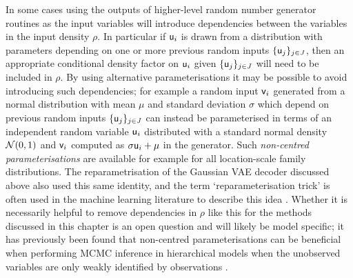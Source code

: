 In some cases using the outputs of higher-level random number generator routines as the input variables will introduce dependencies between the variables in the input density $\rho$. In particular if $\mathsf{u}_i$ is drawn from a distribution with parameters depending on one or more previous random inputs $\lbrace \mathsf{u}_j\rbrace_{j\in\mathit{J}}$, then an appropriate conditional density factor on $\mathsf{u}_i$ given $\lbrace \mathsf{u}_j\rbrace_{j\in\mathit{J}}$ will need to be included in $\rho$. By using alternative parameterisations it may be possible to avoid introducing such dependencies; for example a random input $\mathsf{v}_i$ generated from a normal distribution with mean $\mu$ and standard deviation $\sigma$ which depend on previous random inputs $\lbrace \mathsf{u}_j\rbrace_{j\in\mathit{J}}$ can instead be parameterised in terms of an independent random variable $\mathsf{u}_i$ distributed with a standard normal density $\nrm{0,1}$ and $\mathsf{v}_i$ computed as $\sigma \mathsf{u}_i + \mu$ in the generator. Such \emph{non-centred parameterisations} \citep{price1958useful,bonnet1964transformations,papaspiliopoulos2007general} are available for example for all location-scale family distributions. The reparametrisation of the Gaussian \ac{VAE} decoder discussed above also used this same identity, and the term `reparameterisation trick' is often used in the machine learning literature to describe this idea \citep{kingma2013auto}. Whether it is necessarily helpful to remove dependencies in $\rho$ like this for the methods discussed in this chapter is an open question and will likely be model specific; it has previously been found that non-centred parameterisations can be beneficial when performing \ac{MCMC} inference in hierarchical models when the unobserved variables are only weakly identified by observations \citep{papaspiliopoulos2003non,papaspiliopoulos2007general,betancourt2015hamiltonian}.  %



